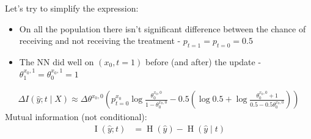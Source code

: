 \documentclass[oneside,12pt]{article}
\begin{document}
%
Let's try to simplify the expression:
\begin{itemize}
    \item On all the population there isn't significant difference between the chance of receiving and not receiving the treatment - $p_{t=1}=p_{t=0}=0.5$
    \item The NN did well on $(x_0,t=1)$ before (and after) the update -  $\theta_1^{x_0,1}=\theta_0^{x_0,1}=1$
\end{itemize}
%
\begin{equation*}
    \begin{split}
        \Delta I(\hat{y};t \mid X) \approx \Delta\theta^{x_0,0} \left(p^{x_0}_{t=0} \operatorname{log}\frac{\theta_0^{x_0,0}}{1-\theta_0^{x_0,0}}- 0.5\left(\operatorname{log}0.5 + \operatorname{log}\frac{\theta_0^{x_0,0}+1}{0.5-0.5\theta_0^{x_0,0}}\right)\right)
    \end{split}
\end{equation*}
%
Mutual information (not conditional):
\begin{equation}
    \begin{split}
        \operatorname{I}(\hat{y}; t) &= \operatorname{H}(\hat{y}) - \operatorname{H}(\hat{y} \mid t)
    \end{split}
\end{equation}  
%
\end{document}
